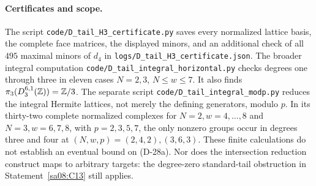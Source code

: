 \paragraph{Certificates and scope.}
The script \texttt{code/D\_tail\_H3\_certificate.py}
saves every normalized lattice basis, the complete
face matrices, the displayed minors, and an additional
check of all \(495\) maximal minors of \(d_4\) in
\texttt{logs/D\_tail\_H3\_certificate.json}.
The broader integral computation
\texttt{code/D\_tail\_integral\_horizontal.py}
checks degrees one through three in eleven cases
\(N=2,3\), \(N\le w\le7\). It also finds
\(\pi_3(D_3^{6,1}(\mathbb Z))=\mathbb Z/3\).
The separate script \texttt{code/D\_tail\_integral\_modp.py}
reduces the integral Hermite lattices, not merely the
defining generators, modulo \(p\). In its thirty-two
complete normalized complexes for
\(N=2,w=4,\ldots,8\) and \(N=3,w=6,7,8\), with
\(p=2,3,5,7\), the only nonzero groups occur in degrees
three and four at \((N,w,p)=(2,4,2),(3,6,3)\).
These finite calculations do not establish an eventual
bound on (D-28a). Nor does the intersection reduction
construct maps to arbitrary targets: the degree-zero
standard-tail obstruction in Statement~\ref{sa08:C13}
still applies.
